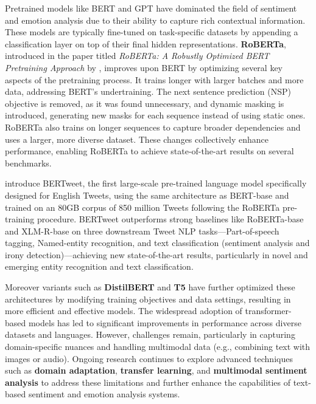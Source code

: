 Pretrained models like BERT and GPT have dominated the field of sentiment and emotion analysis due to their ability to capture rich contextual information. These models are typically fine-tuned on task-specific datasets by appending a classification layer on top of their final hidden representations. \textbf{RoBERTa}, introduced in the paper titled \emph{RoBERTa: A Robustly Optimized BERT Pretraining Approach} by \cite{DBLP:journals/corr/abs-1907-11692}, improves upon BERT by optimizing several key aspects of the pretraining process. It trains longer with larger batches and more data, addressing BERT's undertraining. The next sentence prediction (NSP) objective is removed, as it was found unnecessary, and dynamic masking is introduced, generating new masks for each sequence instead of using static ones. RoBERTa also trains on longer sequences to capture broader dependencies and uses a larger, more diverse dataset. These changes collectively enhance performance, enabling RoBERTa to achieve state-of-the-art results on several benchmarks. 
\newline

\cite{nguyen-etal-2020-bertweet} introduce BERTweet, the first large-scale pre-trained language model specifically designed for English Tweets, using the same architecture as BERT-base and trained on an 80GB corpus of 850 million Tweets following the RoBERTa pre-training procedure. BERTweet outperforms strong baselines like RoBERTa-base and XLM-R-base on three downstream Tweet NLP tasks—Part-of-speech tagging, Named-entity recognition, and text classification (sentiment analysis and irony detection)—achieving new state-of-the-art results, particularly in novel and emerging entity recognition and text classification. 
\newline

Moreover variants such as \textbf{DistilBERT} \cite{sanh2020distilbertdistilledversionbert} and \textbf{T5} \cite{raffel2023exploringlimitstransferlearning} have further optimized these architectures by modifying training objectives and data settings, resulting in more efficient and effective models. The widespread adoption of transformer-based models has led to significant improvements in performance across diverse datasets and languages. However, challenges remain, particularly in capturing domain-specific nuances and handling multimodal data (e.g., combining text with images or audio). Ongoing research continues to explore advanced techniques such as \textbf{domain adaptation}, \textbf{transfer learning}, and \textbf{multimodal sentiment analysis} to address these limitations and further enhance the capabilities of text-based sentiment and emotion analysis systems.

